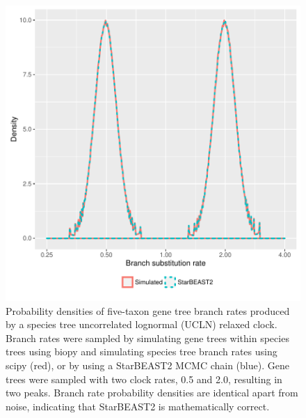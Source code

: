 \documentclass[12pt]{article}
\begin{document}
\begin{figure}[htb!]
\centering
\includegraphics[width=16cm]{gene_branch_rates.pdf}
\caption
{Probability densities of five-taxon gene tree branch rates produced by a
species tree uncorrelated lognormal (UCLN) relaxed clock. Branch rates were
sampled by simulating gene trees within species trees using biopy and simulating
species tree branch rates using scipy (red), or by using a StarBEAST2 MCMC chain
(blue). Gene trees were sampled with two clock rates, 0.5 and 2.0, resulting in
two peaks. Branch rate probability densities are identical apart from noise,
indicating that StarBEAST2 is mathematically correct.}
\label{fig:geneBranchRatesUCLD}
\end{figure}

\clearpage
\end{document}
